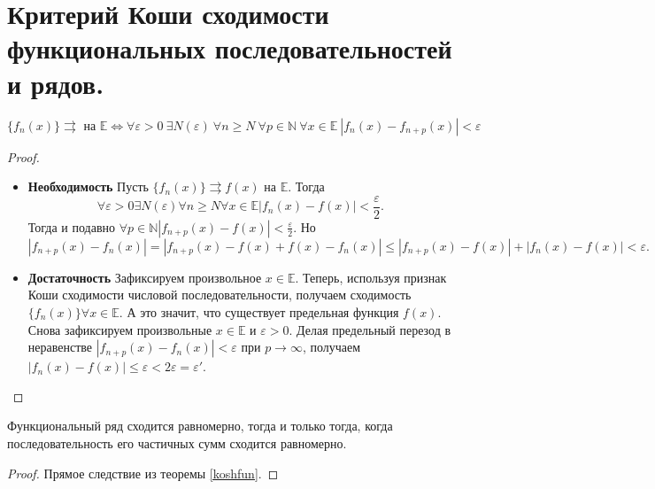 \section{Критерий Коши сходимости функциональных последовательностей и рядов.}

\begin{theorem}\label{koshfun}
    \[
        \{f_n(x)\} \rightrightarrows \text{ на } \mathbb{E}
        \Leftrightarrow
        \forall \varepsilon > 0 \>
        \exists N(\varepsilon) \>
        \forall n \geqslant N \>
        \forall p \in \mathbb{N} \>
        \forall x \in \mathbb{E} \>
        |f_n(x) - f_{n+p}(x)| < \varepsilon
    \]
    \begin{proof}
        \text{} \newline
        \begin{itemize}
            \item \textbf{Необходимость}
                Пусть $\{f_n(x)\} \rightrightarrows f(x)$ на $\mathbb{E}$. Тогда
                \[
                    \forall \varepsilon > 0
                    \exists N(\varepsilon)
                    \forall n \geqslant N
                    \forall x \in \mathbb{E}
                    |f_n(x) - f(x)| < \frac{\varepsilon}{2}.
                \]
                Тогда и подавно $\forall p \in \mathbb{N} |f_{n+p}(x) - f(x)| < \frac{\varepsilon}{2}$. Но
                \[
                    |f_{n+p}(x) - f_n(x)| = |f_{n+p}(x) - f(x) + f(x) - f_n(x)|
                    \leqslant
                    |f_{n+p}(x) - f(x)| + |f_n(x) - f(x)| < \varepsilon.
                \]
            \item \textbf{Достаточность}
            Зафиксируем произвольное $x \in \mathbb{E}$. Теперь, используя признак Коши сходимости числовой последовательности, получаем сходимость $\{f_n(x)\} \forall x \in \mathbb{E}$. А это значит, что существует предельная функция $f(x)$.
            \newline
            Снова зафиксируем произвольные $x \in \mathbb{E}$ и $\varepsilon > 0$. Делая предельный перезод в неравенстве $|f_{n+p}(x) - f_n(x)| < \varepsilon$ при $p \to \infty$, получаем $|f_n(x) - f(x)| \leqslant \varepsilon < 2 \varepsilon = \varepsilon'$.
        \end{itemize}
    \end{proof}
\end{theorem}

\begin{theorem}
    Функциональный ряд сходится равномерно, тогда и только тогда, когда последовательность его частичных сумм сходится равномерно.
    \begin{proof}
        Прямое следствие из теоремы \ref{koshfun}.
    \end{proof}
\end{theorem}